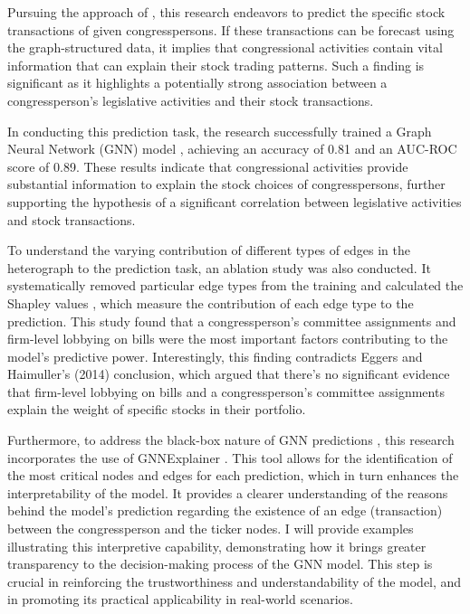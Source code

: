 \documentclass[15pt,letterpaper]{article}
\begin{document}
Pursuing the approach of \cite{eg14}, this research endeavors to predict the specific stock transactions of given congresspersons. If these transactions can be forecast using the graph-structured data, it implies that congressional activities contain vital information that can explain their stock trading patterns. Such a finding is significant as it highlights a potentially strong association between a congressperson's legislative activities and their stock transactions.


In conducting this prediction task, the research successfully trained a Graph Neural Network (GNN) model \citep{gnn1,gnn2, gnn3, gnn4}, achieving an accuracy of 0.81 and an AUC-ROC score of 0.89. These results indicate that congressional activities provide substantial information to explain the stock choices of congresspersons, further supporting the hypothesis of a significant correlation between legislative activities and stock transactions.


To understand the varying contribution of different types of edges in the heterograph to the prediction task, an ablation study was also conducted. It systematically removed particular edge types from the training and calculated the Shapley values \citep{shapley1,shapley2,shapley3}, which measure the contribution of each edge type to the prediction. This study found that a congressperson's committee assignments and firm-level lobbying on bills were the most important factors contributing to the model's predictive power. Interestingly, this finding contradicts Eggers and Haimuller's (2014) conclusion, which argued that there's no significant evidence that firm-level lobbying on bills and a congressperson's committee assignments explain the weight of specific stocks in their portfolio.

Furthermore, to address the black-box nature of GNN predictions \citep{bb1, bb2, bb3}, this research incorporates the use of GNNExplainer \citep{gex}. This tool allows for the identification of the most critical nodes and edges for each prediction, which in turn enhances the interpretability of the model. It provides a clearer understanding of the reasons behind the model's prediction regarding the existence of an edge (transaction) between the congressperson and the ticker nodes. I will provide examples illustrating this interpretive capability, demonstrating how it brings greater transparency to the decision-making process of the GNN model. This step is crucial in reinforcing the trustworthiness and understandability of the model, and in promoting its practical applicability in real-world scenarios.
\end{document}
